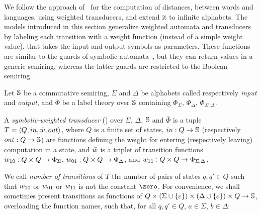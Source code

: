 We follow the approach of~\cite{Mohri03EDWA} for the computation of distances,
between words and languages, using weighted transducers,
and extend it to infinite alphabets.
%
The models introduced in this section generalize
weighted automata and transducers~\cite{Droste09handbook}
by labeling each transition with a weight function (instead of a simple weight value),
that takes the input and output symbols as parameters.
These functions are similar to the guards of symbolic automata~\cite{dAntoniVeanes17CAV,dAntoni21CACM},
but they can return values in a generic semiring,
whereas the latter guards are restricted to the Boolean semiring.
%

\noindent
Let $\mathbb{S}$ be a commutative semiring,
$\Sigma$ and $\Delta$ be alphabets called respectively \emph{input} and \emph{output}, %
and $\bar\Phi$ be a label theory over $\mathbb{S}$
containing $\Phi_\Sigma$, $\Phi_\Delta$, $\Phi_{\Sigma, \Delta}$.

\begin{definition}
\label{def:transducer} \label{def:SWT}
A \emph{symbolic-weighted transducer} (\SWT)
over $\Sigma$, $\Delta$, $\mathbb{S}$ and $\bar\Phi$
is a tuple
$T = \< Q, \init, \bar{\wei}, \final >$,
where $Q$ is a finite set of states,
$\mathsf{in} : Q \to \Semiring$   %
(respectively $\mathsf{out} : Q \to \Semiring$)  %
are functions defining the weight for entering
(respectively leaving) computation in a state,
and $\bar{\wei}$ is a triplet of transition functions
$\wei_{10}: Q \times Q \to \Phi_{\Sigma}$,
$\wei_{01}: Q \times Q \to \Phi_{\Delta}$, and
$\wei_{11}: Q \times Q \to \Phi_{\Sigma, \Delta}$.
\end{definition}
%
\noindent
We call \emph{number of transitions} of $T$ the number of pairs of states
$q, q' \in Q$ such that $\wei_{10}$ or $\wei_{01}$ or $\wei_{11}$
is not the constant $\zero$.
%
\noindent
For convenience, we shall sometimes present transitions
as functions of
$Q \times (\Sigma \cup \{ \varepsilon \}) \times (\Delta \cup \{ \varepsilon \}) \times Q \to \mathbb{S}$,
overloading the function names,
such that, for all $q, q' \in Q$, $a \in \Sigma$,  $b \in \Delta$:

